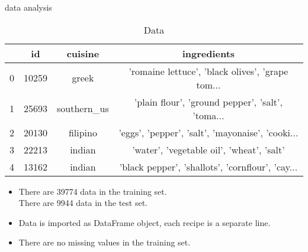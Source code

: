 \documentclass[
 size=14pt,
 paper=smartboard,  %
 mode=present, 		%
 display=slides, 	%
 style=tuliplab,  	%
 pauseslide,
 fleqn,leqno]{powerdot}
\begin{document}
\begin{slide}{data analysis}

  \begin{table}
    \centering
    \caption{Data}  


  \begin{tabular}{c c c c}
    \hline
     & id & cuisine	& ingredients    \\ 
    \hline
    0 & 10259 &	greek	& 'romaine lettuce', 'black olives', 'grape tom...\\
    1	& 25693	& southern_us	& 'plain flour', 'ground pepper', 'salt', 'toma...\\
    2	& 20130	& filipino & 'eggs', 'pepper', 'salt', 'mayonaise', 'cooki...\\
    3	& 22213	& indian & 'water', 'vegetable oil', 'wheat', 'salt'\\
    4	& 13162	& indian & 'black pepper', 'shallots', 'cornflour', 'cay...\\           
    \hline

  \end{tabular}
\end{table}  

\begin{itemize}
  \item There are 39774 data in the training set.\\
        There are 9944 data in the test set.\\      
\end{itemize}

\begin{itemize}
  \item Data is imported as DataFrame object, each recipe is a separate line.\\  
  \item There are no missing values in the training set.\\
\end{itemize}

\end{slide}
\end{document}
